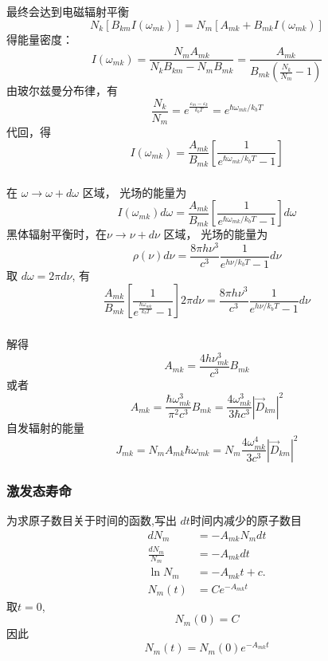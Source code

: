 \begin{frame} 
  \frametitle{}
    最终会达到电磁辐射平衡
    \[ N_k[B_{km}I(\omega _{mk})] = N_m[A_{mk} + B_{mk}I(\omega _{mk})]\]
    得能量密度：
    \[ I(\omega _{mk}) =   \frac{N_mA_{mk}}{N_kB_{km} -N_m B_{mk}} 
    = \frac{A_{mk}}{B_{mk}\left( \frac{N_k}{N_m}-1\right)}
    \]
    由玻尔兹曼分布律，有
    \[\frac{N_k}{N_m} = e^{\frac{\varepsilon _m - \varepsilon _k }{k_b T}} = e^{\hbar\omega _{mk} / k_b T} \]
    代回，得 
    \[ I(\omega _{mk}) 
    = \frac{A_{mk}}{B_{mk}} \left[ \frac{1}{e^{\hbar\omega _{mk} / k_b T} -1}\right]
    \]
\end{frame} 

\begin{frame} 
  \frametitle{}
  在 $\omega \to \omega + d \omega$ 区域， 光场的能量为
  \[ I(\omega _{mk}) d \omega = \frac{A_{mk}}{B_{mk}} \left[ \frac{1}{e^{\hbar\omega _{mk} / k_b T} -1}\right] d \omega \]
  黑体辐射平衡时，在$\nu \to \nu + d \nu$ 区域， 光场的能量为
  \[ \rho(\nu)d \nu =  \frac{8\pi h  \nu ^3}{c^3} \frac{1}{e^{h \nu /k_b T} -1} d \nu\]
  取 $d \omega = 2\pi d \nu$, 有
  \[ \frac{A_{mk}}{B_{mk}} \left[ \frac{1}{e^{\frac{\hbar\omega _{mk}}{k_b T}} -1}\right] 2\pi d \nu = \frac{8\pi h  \nu ^3}{c^3} \frac{1}{e^{h \nu /k_b T} -1} d \nu \]
\end{frame} 

\begin{frame} 
  \frametitle{}
解得 
\[ A_{mk} = \frac{4h \nu ^3 _{mk}}{c^3}  B_{mk}\]
或者
\[ A_{mk} = \frac{\hbar \omega ^3_{mk} }{\pi ^2 c^3}  B_{mk} =  \frac{4\omega ^3_{mk}}{3 \hbar c^3 } \left\vert \vec{D}_{km} \right\vert ^2  \]
自发辐射的能量
\[ J_{mk} = N_m A_{mk} \hbar \omega _{mk} = N_m \frac{4\omega ^4_{mk}}{3  c^3 } \left\vert \vec{D}_{km} \right\vert ^2 \]
\end{frame} 

\begin{frame} 
  \frametitle{激发态寿命}
  为求原子数目关于时间的函数,写出 $dt$时间内减少的原子数目
  \[
    \begin{aligned}
      d N_m &= - A_{mk} N_m dt  \\ 
      \frac{d N_m}{N_m} &= - A_{mk} dt \\
      \ln N_m &= - A_{mk} t +c. \\
      N_m(t) & = Ce^{-A_{mk} t}
    \end{aligned} 
    \]
    取$t=0$,
    \[ N_m (0) = C \]
    因此
    \[N_m (t)  = N_m (0)e^{-A_{mk} t} \]
\end{frame} 

